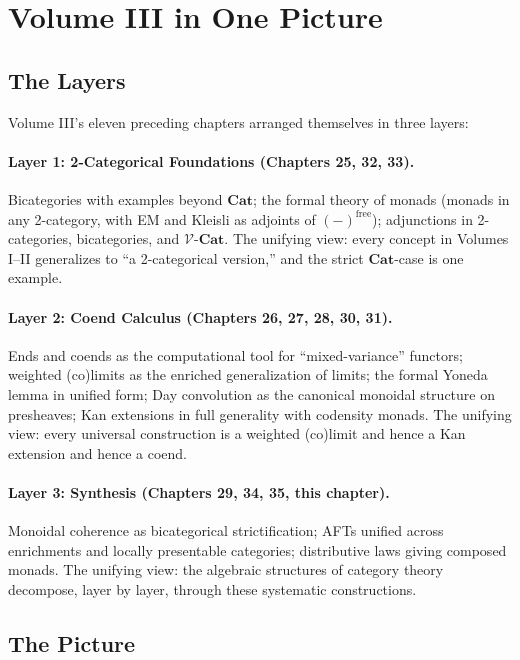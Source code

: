 \section{Volume III in One Picture}
\label{sec:vol3-picture}

\subsection{The Layers}

Volume III's eleven preceding chapters arranged themselves in three layers:

\paragraph{Layer 1: 2-Categorical Foundations (Chapters 25, 32, 33).}
Bicategories with examples beyond $\mathbf{Cat}$; the formal theory of
monads (monads in any 2-category, with EM and Kleisli as adjoints of
$(-)^{\mathrm{free}}$); adjunctions in 2-categories, bicategories, and
$\mathcal{V}$-$\mathbf{Cat}$. The unifying view: every concept in Volumes I--II
generalizes to ``a 2-categorical version,'' and the strict $\mathbf{Cat}$-case
is one example.

\paragraph{Layer 2: Coend Calculus (Chapters 26, 27, 28, 30, 31).}
Ends and coends as the computational tool for ``mixed-variance'' functors;
weighted (co)limits as the enriched generalization of limits; the formal
Yoneda lemma in unified form; Day convolution as the canonical monoidal
structure on presheaves; Kan extensions in full generality with codensity
monads. The unifying view: every universal construction is a weighted
(co)limit and hence a Kan extension and hence a coend.

\paragraph{Layer 3: Synthesis (Chapters 29, 34, 35, this chapter).}
Monoidal coherence as bicategorical strictification; AFTs unified across
enrichments and locally presentable categories; distributive laws giving
composed monads. The unifying view: the algebraic structures of category
theory decompose, layer by layer, through these systematic constructions.

\subsection{The Picture}

